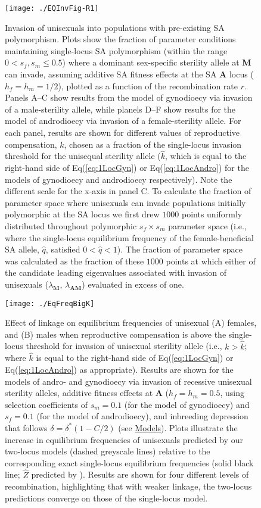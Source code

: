 \documentclass{article}
\begin{document}
{\begin{figure}[htbp]
\centering
\texttt{[image: ./EQInvFig-R1]}
\caption{Invasion of unisexuals into populations with pre-existing SA polymorphism. Plots show the fraction of parameter conditions maintaining single-locus SA polymorphism (within the range $0 < s_f,s_m \leq 0.5$) where a dominant sex-specific sterility allele at $\mathbf{M}$ can invade, assuming additive SA fitness effects at the SA $\mathbf{A}$ locus ($h_f=h_m=1/2$), plotted as a function of the recombination rate $r$. Panels A--C show results from the model of gynodioecy via invasion of a male-sterility allele, while planels D--F show results for the model of androdioecy via invasion of a female-sterility allele. For each panel, results are shown for different values of reproductive compensation, $k$, chosen as a fraction of the single-locus invasion threshold for the unisequal sterility allele ($\hat{k}$, which is equal to the right-hand side of Eq(\ref{eq:1LocGyn}) or Eq(\ref{eq:1LocAndro}) for the models of gynodioecy and androdioecy respectively). Note the different scale for the x-axis in panel C. To calculate the fraction of parameter space where unisexuals can invade populations initially polymorphic at the SA locus we first drew $1000$ points uniformly distributed throughout polymorphic $s_f \times s_m$ parameter space (i.e., where the single-locus equilibrium frequency of the female-beneficial SA allele, $\hat{q}$, satisfied $0 < \hat{q} < 1$). The fraction of parameter space was calculated as the fraction of these $1000$ points at which either of the candidate leading eigenvalues associated with invasion of unisexuals ($\lambda_{\mathbf{M}}$, $\lambda_{\mathbf{AM}}$) evaluated in excess of one.}
\label{fig:PrInv}
\end{figure}
\newpage{}

\begin{figure}[htbp]
\centering
\texttt{[image: ./EqFreqBigK]}
\caption{Effect of linkage on equilibrium frequencies of unisexual (A) females, and (B) males when reproductive compensation is above the single-locus threshold for invasion of unisexual sterility allele (i.e., $k > \hat{k}$; where $\hat{k}$ is equal to the right-hand side of Eq(\ref{eq:1LocGyn}) or Eq(\ref{eq:1LocAndro}) as appropriate). Results are shown for the models of andro- and gynodioecy via invasion of recessive unisexual sterility alleles, additive fitness effects at $\mathbf{A}$ ($h_f = h_m = 0.5$, using selection coefficients of $s_m = 0.1$ (for the model of gynodioecy) and $s_f = 0.1$ (for the model of androdioecy), and inbreeding depression that follows $\delta = \delta^\ast(1 - C/2)$ (see \hyperref[sec:Models]{Models}). Plots illustrate the increase in equilibrium frequencies of unisexuals predicted by our two-locus models (dashed greyscale lines) relative to the corresponding exact single-locus equilibrium frequencies (solid black line; $\hat{Z}$ predicted by \citealt{Charlesworth1978a}). Results are shown for four different levels of recombination, highlighting that with weaker linkage, the two-locus predictions converge on those of the single-locus model.}
\label{fig:eqFreq2v1Loc}
\end{figure}
\newpage{}

}
\end{document}
